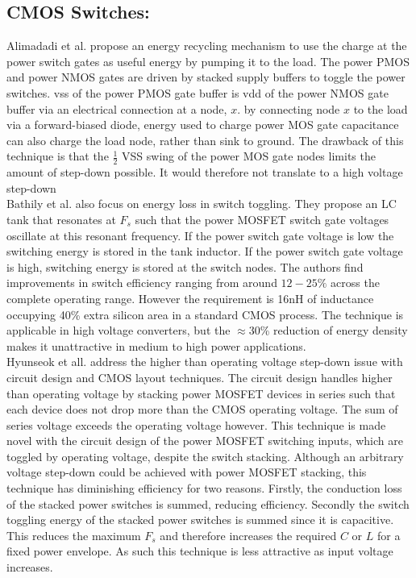 \documentclass[letterpaper,twocolumn,10pt]{article}
\begin{document}
\subsection{CMOS Switches: }Alimadadi et al.\cite{Alimadadi2008} propose an energy recycling mechanism to use the charge at the power switch gates as useful energy by pumping it to the load. The power PMOS and power NMOS gates are driven by stacked supply buffers to toggle the power switches. vss of the power PMOS gate buffer is vdd of the power NMOS gate buffer via an electrical connection at a node, $x$. by connecting node $x$ to the load via a forward-biased diode, energy used to charge power MOS gate capacitance can also charge the load node, rather than sink to ground. The drawback of this technique is that the $\frac{1}{2}$ VSS swing of the power MOS gate nodes limits the amount of step-down possible. It would therefore not translate to a high voltage step-down\\
\indent Bathily et al.\cite{Bathily2012} also focus on energy loss in switch toggling. They propose an LC tank that resonates at $F_s$ such that the power MOSFET switch gate voltages oscillate at this resonant frequency. If the power switch gate voltage is low the switching energy is stored in the tank inductor. If the power switch gate voltage is high, switching energy is stored at the switch nodes. The authors find improvements in switch efficiency ranging from around $12 - 25\%$ across the complete operating range. However the requirement is 16nH of inductance occupying 40\% extra silicon area in a standard CMOS process. The technique is applicable in high voltage converters, but the $\approx$30\% reduction of energy density makes it unattractive in medium to high power applications.\\
\indent Hyunseok et all.\cite{Hyunseok2012} address the higher than operating voltage step-down issue with circuit design and CMOS layout techniques. The circuit design handles higher than operating voltage by stacking power MOSFET devices in series such that each device does not drop more than the CMOS operating voltage. The sum of series voltage exceeds the operating voltage however. This technique is made novel with the circuit design of the power MOSFET switching inputs, which are toggled by operating voltage, despite the switch stacking. Although an arbitrary voltage step-down could be achieved with power MOSFET stacking, this technique has diminishing efficiency for two reasons. Firstly, the conduction loss of the stacked power switches is summed, reducing efficiency. Secondly the switch toggling energy of the stacked power switches is summed since it is capacitive. This reduces the maximum $F_s$ and therefore increases the required $C$ or $L$ for a fixed power envelope. As such this technique is less attractive as input voltage increases.\\
\end{document}
